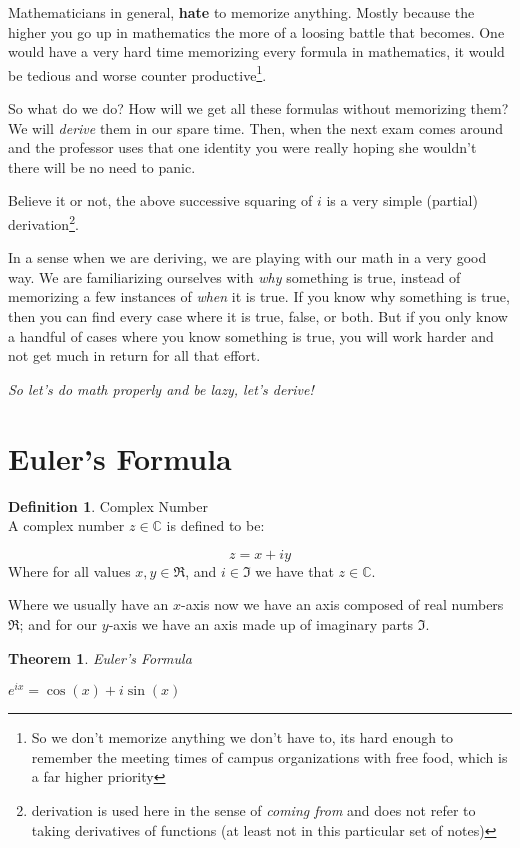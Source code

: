 \documentclass[10pt]{article}
\theoremstyle{definition}
\newtheorem*{defn}{Definition}
\theoremstyle{plain}
\newtheorem*{thm}{Theorem}
\theoremstyle{remark}
\newcommand{\eul}[1]{e^{i#1} = \cos{(#1)} + i\sin{(#1)}}
\begin{document}
Mathematicians in general, \textbf{hate} to memorize anything. Mostly because the higher you go up in mathematics the more of a loosing battle that becomes. One would have a very hard time memorizing every formula in mathematics, it would be tedious and worse counter productive\footnote{So we don't memorize anything we don't have to, its hard enough to remember the meeting times of campus organizations with free food, which is a far higher priority}.


So what do we do? How will we get all these formulas without memorizing them? We will \textit{derive} them in our spare time. Then, when the next exam comes around and the professor uses that one identity you were really hoping she wouldn't there will be no need to panic.

Believe it or not, the above successive squaring of $i$ is a very simple (partial) derivation\footnote{derivation is used here in the sense of \textit{coming from} and does not refer to taking derivatives of functions (at least not in this particular set of notes)}.

In a sense when we are deriving, we are playing with our math in a very good way. We are familiarizing ourselves with \textit{why} something is true, instead of memorizing a few instances of \textit{when} it is true. If you know why something is true, then you can find every case where it is true, false, or both. But if you only know a handful of cases where you know something is true, you will work harder and not get much in return for all that effort.

\textit{So let's do math properly and be lazy, let's derive!}


\section*{Euler's Formula}

\begin{defn}{Complex Number \\}
A complex number $z \in \mathbb{C}$ is defined to be:

\[ z = x + iy \]
Where for all values $x, y \in \Re$, and $i \in \Im$ we have that $z \in \mathbb{C}$. 
\end{defn}

\medskip

Where we usually have an $x$-axis now we have an axis composed of real numbers $\Re$; and for our $y$-axis we have an axis made up of imaginary parts $\Im$. 


\begin{thm}{Euler's Formula \\} 

$ \eul{x} $
\end{thm}
\end{document}
